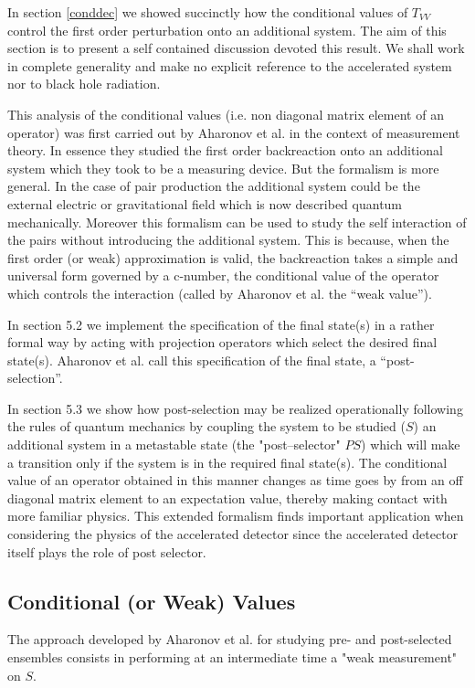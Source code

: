 In section \ref{conddec} we showed succinctly  how the conditional values of
$T_{VV}$  control the first order perturbation onto an additional
system. The aim of this section is to present a self contained
discussion devoted this result.
We shall work in complete
generality and make no explicit reference to the accelerated
system nor to black hole radiation.

This analysis of the conditional values (i.e. non diagonal
matrix element of an
operator)  was first carried out by Aharonov et al. \cite{aharo}
in the context of
measurement theory. In
essence they studied the first order backreaction
 onto an
additional system
which they took to be a measuring device. But the formalism is
more general. In the case of pair production the additional system could
be the external electric or gravitational field which is now
described quantum mechanically. Moreover this formalism can be used to
study the self interaction of
the pairs without introducing the additional system. This is because,
when the first order (or weak)  approximation is
valid, the backreaction takes a simple and universal form governed by  a
c-number, the conditional value of the operator which controls the
interaction (called by Aharonov et al. the ``weak value'').

In section 5.2 we implement the specification of the
final state(s) in a  rather formal way by acting  with projection
operators  which select
the desired final state(s). Aharonov et al.  call this
specification of the final state, a ``post-selection''.

In section 5.3 we show
how  post-selection may be realized operationally following the rules of
quantum mechanics by coupling the system to be studied ($S$)
an  additional system in a metastable
state   (the "post--selector" $PS$) which will make a transition only if the
system is in the required  final state(s).
The conditional value of an operator obtained in this manner changes as time
goes by from an off diagonal matrix element
to an expectation value, thereby making
contact with more familiar physics. This extended formalism finds important
application when considering the physics of the accelerated detector since
the accelerated detector itself plays the role of post selector.

\subsection{Conditional (or Weak) Values}

The approach developed by
Aharonov et al.\cite{aharo} for studying pre- and post-selected
ensembles
consists in performing at an intermediate time a "weak measurement"
on $S$.


